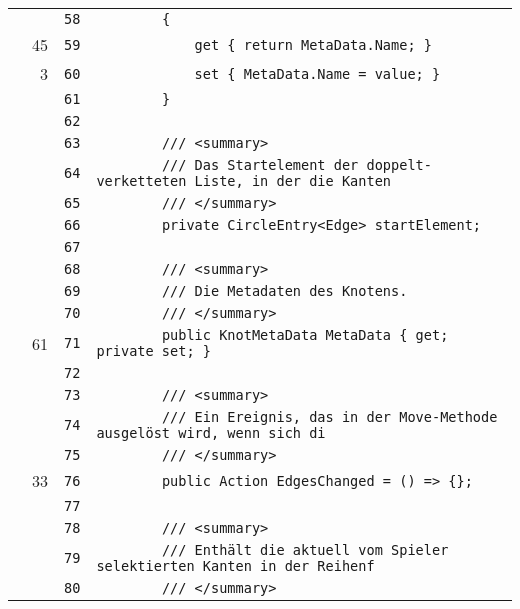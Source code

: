 \documentclass[a4paper,10pt]{article}
\begin{document}
\begin{longtable}[l]{lrrl}
\cellcolor{gray} &  & \verb~58~ & \verb~        {~\\
\cellcolor{green} & 45 & \verb~59~ & \verb~            get { return MetaData.Name; }~\\
\cellcolor{green} & 3 & \verb~60~ & \verb~            set { MetaData.Name = value; }~\\
\cellcolor{gray} &  & \verb~61~ & \verb~        }~\\
\cellcolor{gray} &  & \verb~62~ & \verb~~\\
\cellcolor{gray} &  & \verb~63~ & \verb~        /// <summary>~\\
\cellcolor{gray} &  & \verb~64~ & \verb~        /// Das Startelement der doppelt-verketteten Liste, in der die Kanten ~\\
\cellcolor{gray} &  & \verb~65~ & \verb~        /// </summary>~\\
\cellcolor{gray} &  & \verb~66~ & \verb~        private CircleEntry<Edge> startElement;~\\
\cellcolor{gray} &  & \verb~67~ & \verb~~\\
\cellcolor{gray} &  & \verb~68~ & \verb~        /// <summary>~\\
\cellcolor{gray} &  & \verb~69~ & \verb~        /// Die Metadaten des Knotens.~\\
\cellcolor{gray} &  & \verb~70~ & \verb~        /// </summary>~\\
\cellcolor{green} & 61 & \verb~71~ & \verb~        public KnotMetaData MetaData { get; private set; }~\\
\cellcolor{gray} &  & \verb~72~ & \verb~~\\
\cellcolor{gray} &  & \verb~73~ & \verb~        /// <summary>~\\
\cellcolor{gray} &  & \verb~74~ & \verb~        /// Ein Ereignis, das in der Move-Methode ausgelöst wird, wenn sich di~\\
\cellcolor{gray} &  & \verb~75~ & \verb~        /// </summary>~\\
\cellcolor{green} & 33 & \verb~76~ & \verb~        public Action EdgesChanged = () => {};~\\
\cellcolor{gray} &  & \verb~77~ & \verb~~\\
\cellcolor{gray} &  & \verb~78~ & \verb~        /// <summary>~\\
\cellcolor{gray} &  & \verb~79~ & \verb~        /// Enthält die aktuell vom Spieler selektierten Kanten in der Reihenf~\\
\cellcolor{gray} &  & \verb~80~ & \verb~        /// </summary>~\\

\end{longtable}
\end{document}
